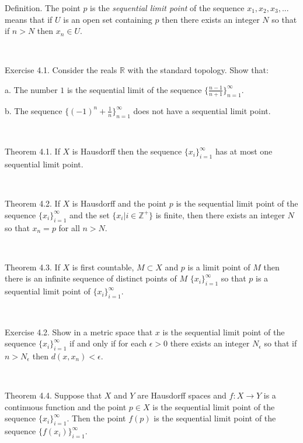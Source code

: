 \documentclass[12pt, std]{article}
\begin{document}
Definition. The point $p$ is the \textit{sequential limit point} of
the sequence $x_1, x_2, x_3, ... $ means that if $U$ is an open set
containing $p$ then there exists an integer $N$ so that if $n>N$
then $x_n \in U$.

\

Exercise 4.1.  Consider the reals $\mathbb{R}$ with the standard topology.  Show
that:

\qquad a.  The number $1$ is the sequential limit of the sequence
$\{ \frac {n-1}{n+1} \}_{n=1}^{\infty}$.

\qquad b.  The sequence $\{ (-1)^n +\frac 1n \}_{n=1}^{\infty}$ does
not have a sequential limit point.

\

Theorem 4.1.  If $X$ is Hausdorff then the sequence
$\{x_i\}_{i=1}^{\infty}$ has at most one sequential limit point.

\

Theorem 4.2.  If $X$ is Hausdorff and the point $p$ is the
sequential limit point of the sequence $\{x_i\}_{i=1}^{\infty}$ and
the set $ \{ x_i | i \in \mathbb{Z}^+\}$ is finite, then there
exists an integer $N$ so that $x_n = p$ for all $n > N$.

\

Theorem 4.3.  If $X$ is first countable, $M \subset X$ and $p$ is a limit point of
$M$ then there is an infinite sequence of distinct points of $M$
$\{x_i\}_{i=1}^{\infty}$ so that $p$ is a sequential limit point of
$\{x_i\}_{i=1}^{\infty}$.

\

Exercise 4.2. Show in a metric space that $x$ is the sequential limit point of the sequence $\{x_i\}_{i=1}^{\infty}$ if and only if for each $\epsilon >0$ there exists an integer $N_\epsilon$ so that if $n > N_\epsilon$ then $d(x, x_n) < \epsilon$.

\

Theorem 4.4.  Suppose that $X$ and $Y$ are Hausdorff spaces and $f:
X \rightarrow Y$ is a continuous function and the point $p\in X$ is
the sequential limit point of the sequence $\{x_i\}_{i=1}^{\infty}$.
Then the point $f(p)$ is the sequential limit point of the sequence
$\{f(x_i)\}_{i=1}^{\infty}$.
\end{document}
